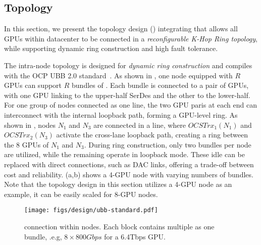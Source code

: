 
\subsection{\sys Topology}
\label{section:design:topology}


In this section, we present the \sys{} topology design () integrating \docs{} that allows all GPUs within datacenter to be connected in a \textit{reconfigurable K-Hop Ring topology}, while supporting dynamic ring construction and high fault tolerance.  

 The intra-node topology is designed for \textit{dynamic ring construction} and compiles with the OCP UBB 2.0 standard~\cite{UBB2.0}. As shown in , one node equipped with $R$ GPUs can support $R$ bundles of \ocstrx. Each \docs{} bundle is connected to a pair of GPUs, with one GPU linking to the upper-half SerDes and the other to the lower-half.
For one group of nodes connected as one line, the two GPU paris at each end can interconnect with the \ocstrx \xspace internal loopback path, forming a GPU-level ring. 
As shown in , nodes $N_1$ and $N_3$ are connected in a line, where $OCSTrx_1(N_1)$ and $OCSTrx_2(N_3)$ activate the cross-lane loopback path, creating a ring between the 8 GPUs of $N_1$ and $N_3$.
During ring construction, only two \docs{} bundles per node are utilized, while the remaining \docs{} operate in loopback mode. These idle \docs{} can be replaced with direct connections, such as DAC links, offering a trade-off between cost and reliability. (a,b) shows a 4-GPU node with varying numbers of \textit{\docs{}} bundles. Note that the topology design in this section utilizes a 4-GPU node as an example, it can be easily scaled for 8-GPU nodes.

\begin{figure}[h!t]
   \centering
   \texttt{[image: figs/design/ubb-standard.pdf]}
   \vspace{-2ex}
   \caption{\ocstrx{} connection within nodes. Each block contains multiple \ocstrx \xspace as one bundle, .e.g, $8\times 800Gbps$ \ocstrx \xspace for a 6.4Tbps GPU. }

   \label{fig:degin:topo:ubb}
   \vspace{-2ex}
\end{figure}

